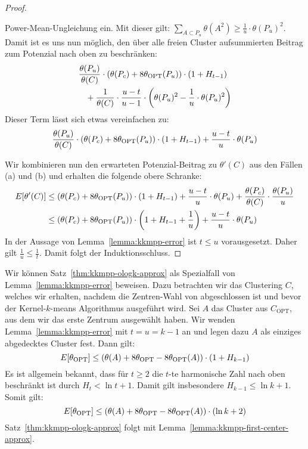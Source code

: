 \begin{proof}
\begin{enumerate}
					Power-Mean-Ungleichung ein. Mit dieser gilt:
					$ \sum_{A \subset P_u} \theta(A^2) \geq \frac{1}{u} \cdot \theta(P_u)^2 $.
					Damit ist es uns nun möglich, den über alle freien Cluster aufsummierten Beitrag zum Potenzial
					nach oben zu beschränken:
					\begin{align*}
						&\frac{\theta(P_u)}{\theta(C)} \cdot \left( \theta(P_c) + 8 \theta_{\textrm{OPT}}(P_u) \right) \cdot (1 + H_{t-1}) \\
						& \; \; \; + \frac{1}{\theta(C)} \cdot \frac{u-t}{u-1} \cdot \left( 
						\theta(P_u)^2 - \frac{1}{u} \cdot \theta(P_u)^2 \right)
					\end{align*}
					Dieser Term lässt sich etwas vereinfachen zu:
					\[ \frac{\theta(P_u)}{\theta(C)} \cdot \left( \theta(P_c) + 8 \theta_{\textrm{OPT}}(P_u) \right) \cdot (1 + H_{t-1})
						+ \frac{u-t}{u} \cdot \theta(P_u) \]
	\end{enumerate}
	Wir kombinieren nun den erwarteten Potenzial-Beitrag zu $\theta'(C)$ aus den Fällen (a) und (b) und erhalten die folgende
	obere Schranke:
	\begin{align*}
		E[\theta'(C)] &\leq \left( \theta(P_c) + 8 \theta_{\textrm{OPT}}(P_u) \right) \cdot (1 + H_{t-1})
			+ \frac{u-t}{u} \cdot \theta(P_u) + \frac{\theta(P_c)}{\theta(C)} \cdot \frac{\theta(P_u)}{u} \\
			&\leq \left( \theta(P_c) + 8 \theta_{\textrm{OPT}}(P_u) \right) \cdot \left( 1 + H_{t-1} + \frac{1}{u} \right)
				+ \frac{u-t}{u} \cdot \theta(P_u)
	\end{align*}
	In der Aussage von Lemma~\ref{lemma:kkmpp-error} ist $t \leq u$ vorausgesetzt. Daher gilt $\frac{1}{u} \leq \frac{1}{t}$.
	Damit folgt der Induktionsschluss.
\end{proof}
Wir können Satz~\ref{thm:kkmpp-ologk-approx} als Spezialfall von Lemma~\ref{lemma:kkmpp-error} beweisen. Dazu betrachten wir
das Clustering $C$, welches wir erhalten, nachdem die Zentren-Wahl von \kkmpp{} abgeschlossen ist und bevor der Kernel-$k$-means
Algorithmus ausgeführt wird. Sei $A$ das Cluster aus $C_\textrm{OPT}$, aus dem wir das erste Zentrum ausgewählt haben.
Wir wenden Lemma~\ref{lemma:kkmpp-error} mit $t = u = k-1$ an und legen dazu $A$ als einziges abgedecktes Cluster fest.
Dann gilt:
\[ E[\theta_{\textrm{OPT}}] \leq \left( \theta(A) + 8 \theta_{\textrm{OPT}} - 8 \theta_{\textrm{OPT}}(A) \right) \cdot (1 + H_{k-1}) \]
Es ist allgemein bekannt, dass für $t \geq 2$ die $t$-te harmonische Zahl nach oben beschränkt ist durch $H_t < \ln{t} + 1$.
Damit gilt insbesondere $H_{k-1} \leq \ln{k} + 1$. Somit gilt:
\[ E[\theta_{\textrm{OPT}}] \leq \left( \theta(A) + 8 \theta_{\textrm{OPT}} - 8 \theta_{\textrm{OPT}}(A) \right) \cdot (\ln{k} + 2) \]
Satz~\ref{thm:kkmpp-ologk-approx} folgt mit Lemma~\ref{lemma:kkmpp-first-center-approx}.

